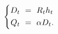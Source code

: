 \begin{equation}
\begin{cases}
    \begin{split}
        D_{t} \
        & = \ R_{t} h_{t} \hspace{0.2cm} \\
        Q_{t} \
        & = \ \alpha D_{t}.
    \end{split}
\end{cases}
\label{Equation:Firms-Problem_Aggregate-Drilling-and-Production}
\end{equation}